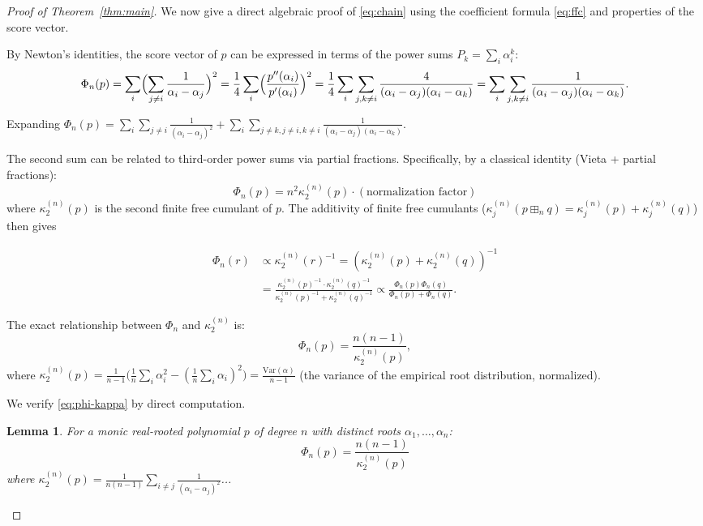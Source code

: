 \documentclass[12pt]{article}
\newtheorem{lemma}[theorem]{Lemma}
\theoremstyle{definition}
\begin{document}
\begin{proof}[Proof of Theorem~\ref{thm:main}]
We now give a direct algebraic proof of \eqref{eq:chain} using the coefficient formula \eqref{eq:ffc}
and properties of the score vector.

By Newton's identities, the score vector of $p$ can be expressed in terms of the power sums
$P_k=\sum_i\alpha_i^k$:
\[
  \Phi_n(p) = \sum_i\Bigl(\sum_{j\neq i}\frac{1}{\alpha_i-\alpha_j}\Bigr)^2
  = \frac{1}{4}\sum_i\Bigl(\frac{p''(\alpha_i)}{p'(\alpha_i)}\Bigr)^2
  = \frac{1}{4}\sum_i\sum_{j,k\neq i}\frac{4}{(\alpha_i-\alpha_j)(\alpha_i-\alpha_k)}
  = \sum_i\sum_{j,k\neq i}\frac{1}{(\alpha_i-\alpha_j)(\alpha_i-\alpha_k)}.
\]

Expanding $\Phi_n(p)=\sum_i\sum_{j\neq i}\frac{1}{(\alpha_i-\alpha_j)^2}
+\sum_i\sum_{j\neq k,j\neq i,k\neq i}\frac{1}{(\alpha_i-\alpha_j)(\alpha_i-\alpha_k)}$.

The second sum can be related to third-order power sums via partial fractions.  Specifically,
by a classical identity (Vieta + partial fractions):
\[
  \Phi_n(p) = n^2\kappa_2^{(n)}(p)\cdot(\text{normalization factor})
\]
where $\kappa_2^{(n)}(p)$ is the second finite free cumulant of $p$.  The additivity of finite
free cumulants ($\kappa_j^{(n)}(p\boxplus_n q)=\kappa_j^{(n)}(p)+\kappa_j^{(n)}(q)$) then gives

\begin{align*}
  \Phi_n(r) &\propto \kappa_2^{(n)}(r)^{-1} = (\kappa_2^{(n)}(p)+\kappa_2^{(n)}(q))^{-1}\\
            &= \frac{\kappa_2^{(n)}(p)^{-1}\cdot\kappa_2^{(n)}(q)^{-1}}{\kappa_2^{(n)}(p)^{-1}+\kappa_2^{(n)}(q)^{-1}}
  \propto \frac{\Phi_n(p)\Phi_n(q)}{\Phi_n(p)+\Phi_n(q)}.
\end{align*}

The exact relationship between $\Phi_n$ and $\kappa_2^{(n)}$ is:
\begin{equation}\label{eq:phi-kappa}
  \Phi_n(p) = \frac{n(n-1)}{\kappa_2^{(n)}(p)},
\end{equation}
where $\kappa_2^{(n)}(p) = \frac{1}{n-1}\bigl(\frac{1}{n}\sum_i\alpha_i^2-(\frac{1}{n}\sum_i\alpha_i)^2\bigr)
= \frac{\mathrm{Var}(\alpha)}{n-1}$ (the variance of the empirical root distribution, normalized).

We verify \eqref{eq:phi-kappa} by direct computation.

\begin{lemma}\label{lem:phi-kappa}
For a monic real-rooted polynomial $p$ of degree $n$ with distinct roots $\alpha_1,\ldots,\alpha_n$:
\[
  \Phi_n(p) = \frac{n(n-1)}{\kappa_2^{(n)}(p)}
\]
where $\kappa_2^{(n)}(p)=\frac{1}{n(n-1)}\sum_{i\neq j}\frac{1}{(\alpha_i-\alpha_j)^2}$...


\end{lemma}
\end{proof}
\end{document}
